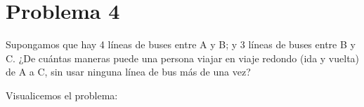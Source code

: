 \section{Problema 4}
Supongamos que hay 4 líneas de buses entre A y B; y 3 líneas de buses entre B y C. ¿De cuántas maneras puede una persona viajar en viaje redondo (ida y vuelta) de A a C, sin usar ninguna línea de bus más de una vez?

\begin{solution}
Visualicemos el problema: 
\begin{center}
    


\begin{tikzpicture}[x=0.75pt,y=0.75pt,yscale=-1,xscale=1]


\end{tikzpicture}
\end{center}
\end{solution}
